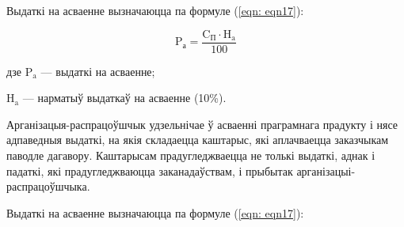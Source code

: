 Выдаткі на асваенне вызначаюцца па формуле (\ref{eqn: eqn17}):

\begin{equation}
    \label{eqn: eqn17}
    \text{P}_\text{а} = \frac{\text{C}_\text{П} \cdot \text{H}_\text{a}}{100}
\end{equation}
\begin{Explanation}
    \item[дзе] $\text{P}_\text{a}$ --- выдаткі на асваенне;
    \item $\text{H}_\text{a}$ --- нарматыў выдаткаў на асваенне (10\%).
\end{Explanation}

Арганізацыя-распрацоўшчык удзельнічае ў асваенні праграмнага прадукту і нясе адпаведныя выдаткі, на якія складаецца каштарыс, які аплачваецца заказчыкам паводле дагавору. Каштарысам прадугледжваецца не толькі выдаткі, аднак і падаткі, які прадугледжваюцца заканадаўствам, і прыбытак арганізацыі-распрацоўшчыка.

Выдаткі на асваенне вызначаюцца па формуле (\ref{eqn: eqn17}):

